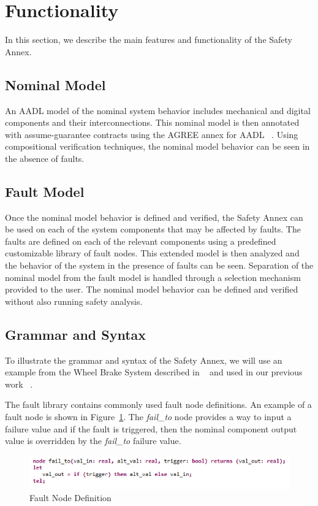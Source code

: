 \section{Functionality}
In this section, we describe the main features and functionality of the Safety Annex. 

\subsection{Nominal Model}
An AADL model of the nominal system behavior includes mechanical and digital components and their interconnections. This nominal model is then annotated with assume-guarantee contracts using the AGREE annex for AADL ~\cite{NFM2012:CoGaMiWhLaLu}. Using compositional verification techniques, the nominal model behavior can be seen in the absence of faults. 

\subsection{Fault Model}
Once the nominal model behavior is defined and verified, the Safety Annex can be used on each of the system components that may be affected by faults. The faults are defined on each of the relevant components using a predefined customizable library of fault nodes. This extended model is then analyzed and the behavior of the system in the presence of faults can be seen. Separation of the nominal model from the fault model is handled through a selection mechanism provided to the user. The nominal model behavior can be defined and verified without also running safety analysis. 

\subsection{Grammar and Syntax}
To illustrate the grammar and syntax of the Safety Annex, we will use an example from the Wheel Brake System described in ~\cite{AIR6110} and used in our previous work ~\cite{Stewart17:IMBSA}. 

The fault library contains commonly used fault node definitions. An example of a fault node is shown in Figure~\ref{fig:faultNodeDef}. The \textit{fail\_to} node provides a way to input a failure value and if the fault is triggered, then the nominal component output value is overridden by the \textit{fail\_to} failure value. 

\begin{figure}
\begin{center}
\includegraphics[width=1.0\textwidth]{images/faultNode.png}
\end{center}
\vspace{-0.2in}
\caption{Fault Node Definition}
\label{fig:faultNodeDef}
\end{figure}

